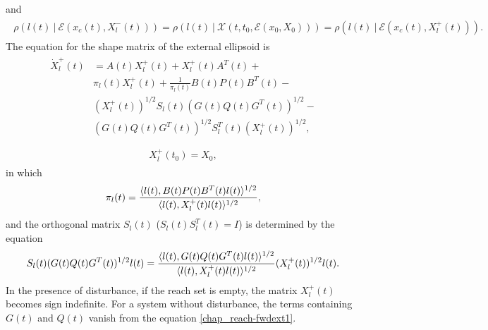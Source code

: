 \documentclass[letterpaper,10pt,english]{sphinxmanual}
\begin{document}
and
\label{chap_reach:equation-fwdtightness}\begin{gather}
\begin{split}\rho(l(t) ~|~ {\mathcal E}(x_c(t), X^-_l(t))) =
\rho(l(t) ~|~ {\mathcal X}(t, t_0, {\mathcal E}(x_0,X_0))) =
\rho(l(t) ~|~ {\mathcal E}(x_c(t), X^+_l(t))) .\end{split}\label{chap_reach-fwdtightness}
\end{gather}
The equation for the shape matrix of the external ellipsoid is
\label{chap_reach:equation-fwdext1}\begin{gather}
\begin{split}\dot{X}^+_l(t) & = A(t)X^+_l(t) + X^+_l(t)A^T(t) +\nonumber \\
&\pi_l(t)X^+_l(t) + \frac{1}{\pi_l(t)}B(t)P(t)B^T(t) -\nonumber \\
& (X_l^{+}(t))^{1/2}S_l(t)(G(t)Q(t)G^T(t))^{1/2} \nonumber -\\
& (G(t)Q(t)G^T(t))^{1/2}S_l^T(t)(X_l^{+}(t))^{1/2}, \\\end{split}\label{chap_reach-fwdext1}
\end{gather}\label{chap_reach:equation-fwdext2}\begin{gather}
\begin{split}X^+_l(t_0) =X_0,\end{split}\label{chap_reach-fwdext2}
\end{gather}
in which
\begin{gather}
\begin{split}\pi_l(t) = \frac{\langle l(t),
B(t)P(t)B^T(t)l(t)\rangle^{1/2}}{\langle l(t), X^+_l(t)l(t)\rangle^{1/2}},\end{split}\notag
\end{gather}
and the orthogonal matrix $S_l(t)$ ($S_l(t)S_l^T(t) = I$)
is determined by the equation
\begin{gather}
\begin{split}S_l(t)(G(t)Q(t)G^T(t))^{1/2}l(t) = \frac{\langle l(t),
G(t)Q(t)G^T(t)l(t)\rangle^{1/2}}{\langle l(t),
X_l^+(t)l(t)\rangle^{1/2}}(X_l^{+}(t))^{1/2}l(t).\end{split}\notag
\end{gather}
In the presence of disturbance, if the reach set is empty, the matrix
$X^+_l(t)$ becomes sign indefinite. For a system without
disturbance, the terms containing $G(t)$ and $Q(t)$ vanish
from the equation \eqref{chap_reach-fwdext1}.
\end{document}

